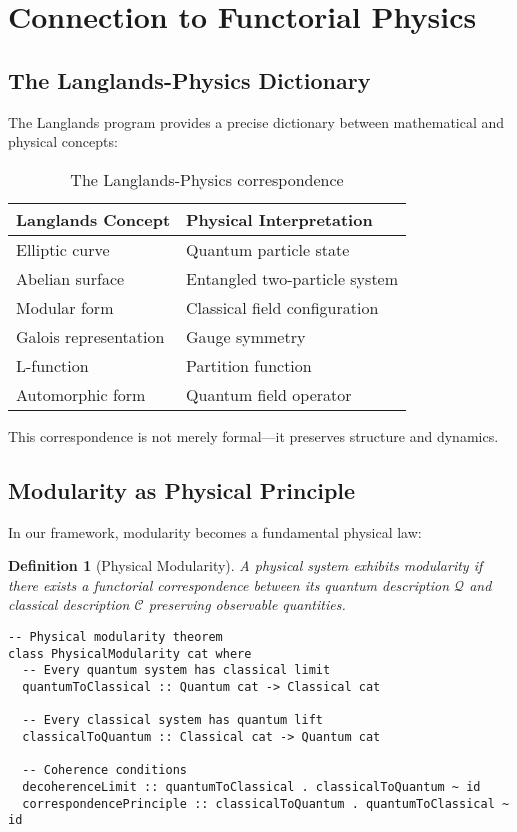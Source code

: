 \documentclass[12pt,a4paper]{article}
\newtheorem{definition}[theorem]{Definition}
\begin{document}
\section{Connection to Functorial Physics}

\subsection{The Langlands-Physics Dictionary}

The Langlands program provides a precise dictionary between mathematical and physical concepts:

\begin{table}[h]
\centering
\begin{tabular}{ll}
\toprule
\textbf{Langlands Concept} & \textbf{Physical Interpretation} \\
\midrule
Elliptic curve & Quantum particle state \\
Abelian surface & Entangled two-particle system \\
Modular form & Classical field configuration \\
Galois representation & Gauge symmetry \\
L-function & Partition function \\
Automorphic form & Quantum field operator \\
\bottomrule
\end{tabular}
\caption{The Langlands-Physics correspondence}
\label{tab:langlands-physics}
\end{table}

This correspondence is not merely formal---it preserves structure and dynamics.

\subsection{Modularity as Physical Principle}

In our framework, modularity becomes a fundamental physical law:

\begin{definition}[Physical Modularity]
A physical system exhibits modularity if there exists a functorial correspondence between its quantum description $\mathcal{Q}$ and classical description $\mathcal{C}$ preserving observable quantities.
\end{definition}

\begin{lstlisting}[style=haskell]
-- Physical modularity theorem
class PhysicalModularity cat where
  -- Every quantum system has classical limit
  quantumToClassical :: Quantum cat -> Classical cat
  
  -- Every classical system has quantum lift
  classicalToQuantum :: Classical cat -> Quantum cat
  
  -- Coherence conditions
  decoherenceLimit :: quantumToClassical . classicalToQuantum ~ id
  correspondencePrinciple :: classicalToQuantum . quantumToClassical ~ id
\end{lstlisting}
\end{document}
